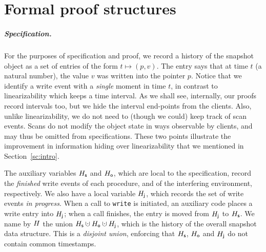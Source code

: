 \section{Formal proof structures}
\label{sc:formal}

\def\histx{\hist_\x}
\def\histy{\hist_\y}
\def\histp{\hist_p}
\newcommand{\E}{E}
\newcommand{\C}{C}
\newcommand{\sx}{S_\x}
\newcommand{\sy}{S_\y}
\newcommand{\spp}{S_p}
\newcommand{\sss}{S_s}
\newcommand{\wx}{W_\x}
\newcommand{\wy}{W_\y}
\newcommand{\wpp}{W_p}

\def\toff{t_{\mathsf{off}}}
\newcommand{\wInit}{\mathsf{W_{off}}}
\newcommand{\wWrite}{\mathsf{New}}
\newcommand{\wDirty}{\mathsf{NeedsFwd}}
\newcommand{\wClean}{\mathsf{Done}}
\newcommand{\sOn}{\mathsf{S_{on}}}
\newcommand{\sOff}{\mathsf{S_{off}}}


\subparagraph*{Specification.}
%
For the purposes of specification and proof, we record a history of
the snapshot object as a set of entries of the form $t \mapsto (p,
v)$. The entry says that at time $t$ (a natural number), the value $v$
was written into the pointer $p$. Notice that we identify a write
event with a \emph{single} moment in time $t$, in contrast to
linearizability which keeps a time interval. As we shall see,
internally, our proofs record intervals too, but we hide the interval
end-points from the clients. Also, unlike linearizability, we do not
need to (though we could) keep track of scan events. Scans do not
modify the object state in ways observable by clients, and may thus be
omitted from specifications. These two points illustrate the
improvement in information hiding over linearizability that we
mentioned in Section~\ref{sc:intro}.


The auxiliary variables $H_{\mathsf{s}}$ and $H_{\mathsf{o}}$, which are local to the
specification, record the \emph{finished} write events of each
procedure, and of the interfering environment, respectively.  We also
have a local variable $H_{\mathsf{j}}$, which records the set of write events
\emph{in progress}. When a call to {\tt write} is initiated, an
auxiliary code places a write entry into $H_{\mathsf{j}}$; when a call
finishes, the entry is moved from $H_{\mathsf{j}}$ to $H_{\mathsf{s}}$.
%
%
We name by $H$ the union $\histS \hunion \histO \hunion \histJ$,
which is the history of the overall snapshot data structure. This is a
\emph{disjoint union}, enforcing that $H_{\mathsf{s}}$, $H_{\mathsf{o}}$ and $H_{\mathsf{j}}$
do not contain common timestamps.

